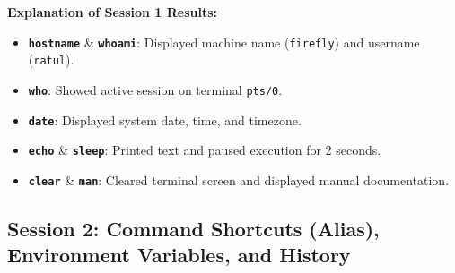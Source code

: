 \documentclass[10pt,a4paper]{article}
\newcommand{\cmd}[1]{\texttt{\textbf{#1}}}
\begin{document}
\vspace{2pt}\noindent\textbf{Explanation of Session 1 Results:}\par\vspace{1pt}
\begin{itemize}[noitemsep,topsep=1pt,leftmargin=1.2em]
  \item \cmd{hostname} \& \cmd{whoami}: Displayed machine name (\texttt{firefly}) and username (\texttt{ratul}).
  \item \cmd{who}: Showed active session on terminal \texttt{pts/0}.
  \item \cmd{date}: Displayed system date, time, and timezone.
  \item \cmd{echo} \& \cmd{sleep}: Printed text and paused execution for 2 seconds.
  \item \cmd{clear} \& \cmd{man}: Cleared terminal screen and displayed manual documentation.
\end{itemize}

\subsection{Session 2: Command Shortcuts (Alias), Environment Variables, and History}
\end{document}
